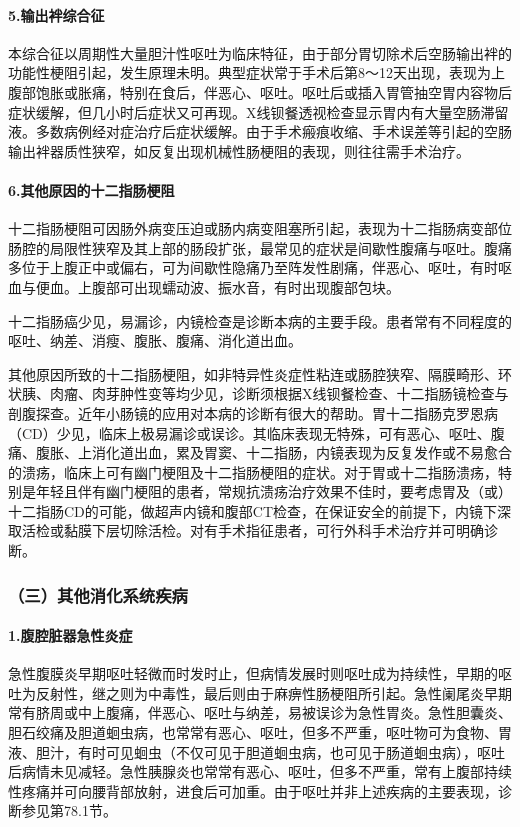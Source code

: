 \paragraph{5.输出袢综合征}

本综合征以周期性大量胆汁性呕吐为临床特征，由于部分胃切除术后空肠输出袢的功能性梗阻引起，发生原理未明。典型症状常于手术后第8～12天出现，表现为上腹部饱胀或胀痛，特别在食后，伴恶心、呕吐。呕吐后或插入胃管抽空胃内容物后症状缓解，但几小时后症状又可再现。X线钡餐透视检查显示胃内有大量空肠滞留液。多数病例经对症治疗后症状缓解。由于手术瘢痕收缩、手术误差等引起的空肠输出袢器质性狭窄，如反复出现机械性肠梗阻的表现，则往往需手术治疗。

\paragraph{6.其他原因的十二指肠梗阻}

十二指肠梗阻可因肠外病变压迫或肠内病变阻塞所引起，表现为十二指肠病变部位肠腔的局限性狭窄及其上部的肠段扩张，最常见的症状是间歇性腹痛与呕吐。腹痛多位于上腹正中或偏右，可为间歇性隐痛乃至阵发性剧痛，伴恶心、呕吐，有时呕血与便血。上腹部可出现蠕动波、振水音，有时出现腹部包块。

十二指肠癌少见，易漏诊，内镜检查是诊断本病的主要手段。患者常有不同程度的呕吐、纳差、消瘦、腹胀、腹痛、消化道出血。

其他原因所致的十二指肠梗阻，如非特异性炎症性粘连或肠腔狭窄、隔膜畸形、环状胰、肉瘤、肉芽肿性变等均少见，诊断须根据X线钡餐检查、十二指肠镜检查与剖腹探查。近年小肠镜的应用对本病的诊断有很大的帮助。胃十二指肠克罗恩病（CD）少见，临床上极易漏诊或误诊。其临床表现无特殊，可有恶心、呕吐、腹痛、腹胀、上消化道出血，累及胃窦、十二指肠，内镜表现为反复发作或不易愈合的溃疡，临床上可有幽门梗阻及十二指肠梗阻的症状。对于胃或十二指肠溃疡，特别是年轻且伴有幽门梗阻的患者，常规抗溃疡治疗效果不佳时，要考虑胃及（或）十二指肠CD的可能，做超声内镜和腹部CT检查，在保证安全的前提下，内镜下深取活检或黏膜下层切除活检。对有手术指征患者，可行外科手术治疗并可明确诊断。

\subsubsection{（三）其他消化系统疾病}

\paragraph{1.腹腔脏器急性炎症}

急性腹膜炎早期呕吐轻微而时发时止，但病情发展时则呕吐成为持续性，早期的呕吐为反射性，继之则为中毒性，最后则由于麻痹性肠梗阻所引起。急性阑尾炎早期常有脐周或中上腹痛，伴恶心、呕吐与纳差，易被误诊为急性胃炎。急性胆囊炎、胆石绞痛及胆道蛔虫病，也常常有恶心、呕吐，但多不严重，呕吐物可为食物、胃液、胆汁，有时可见蛔虫（不仅可见于胆道蛔虫病，也可见于肠道蛔虫病），呕吐后病情未见减轻。急性胰腺炎也常常有恶心、呕吐，但多不严重，常有上腹部持续性疼痛并可向腰背部放射，进食后可加重。由于呕吐并非上述疾病的主要表现，诊断参见第78.1节。

